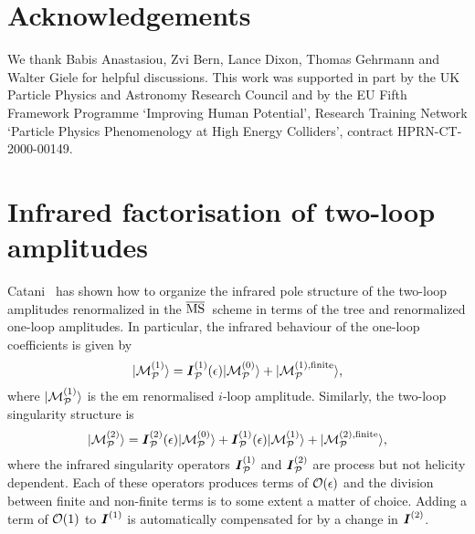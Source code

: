 \documentclass[paper,notoc,nohyper]{JHEP3}
\def\MSbar{$\overline{{\rm MS}}$}
\def\P{{\cal P}}
\def\bom#1{{\mbox{\boldmath $#1$}}}
\begin{document}
\section*{Acknowledgements}
We thank Babis Anastasiou, Zvi Bern, Lance Dixon,  Thomas Gehrmann and Walter Giele for
helpful discussions.
This work was supported in part by the UK Particle Physics and
Astronomy  Research Council and by the EU Fifth Framework Programme `Improving
Human Potential', Research Training Network `Particle Physics Phenomenology  at
High Energy Colliders', contract HPRN-CT-2000-00149.

\appendix

\section{Infrared factorisation of two-loop amplitudes}

\label{app:catani}

Catani~\cite{Catani:polestruc} has shown how to organize the 
infrared pole structure of the two-loop amplitudes renormalized in the 
\MSbar\ scheme in terms of the tree and renormalized one-loop amplitudes.
In particular, the infrared behaviour of the one-loop coefficients is given by
\begin{equation}
\label{eq:cat1}
|{\cal M}_{\P}^{(1)}\rangle = 
{\bom I}_{\P}^{(1)}(\epsilon) |{\cal M}_{\P}^{(0)}\rangle 
+ |{\cal M}_{\P}^{(1),{\rm finite}}\rangle,\label{eq:IRone}
\end{equation}
where $|{\cal M}_{\P}^{(1)}\rangle$ is the {em renormalised} $i$-loop amplitude. 
Similarly, the two-loop singularity structure is
\begin{equation}
\label{eq:cat2}
|{\cal M}_{\P}^{(2)}\rangle = 
 {\bom I}_{\P}^{(2)}(\epsilon) |{\cal M}_{\P}^{(0)}\rangle  
 + {\bom I}_{\P}^{(1)}(\epsilon) |{\cal M}_{\P}^{(1)}\rangle+ |{\cal M}_{\P}^{(2),{\rm finite}}\rangle,
\label{eq:IRtwo}
\end{equation}
where the infrared singularity operators ${\bom I}_{\P}^{(1)}$ and ${\bom I}_{\P}^{(2)}$ are process but not helicity
dependent. Each of these operators produces terms of ${\cal O}(\epsilon)$ and
the division between finite and non-finite terms is to some extent a matter of
choice. Adding a term of ${\cal O}(1)$ to 
${\bom I}^{(1)}$ is automatically compensated for by a change in ${\bom I}^{(2)}$.  
\end{document}
